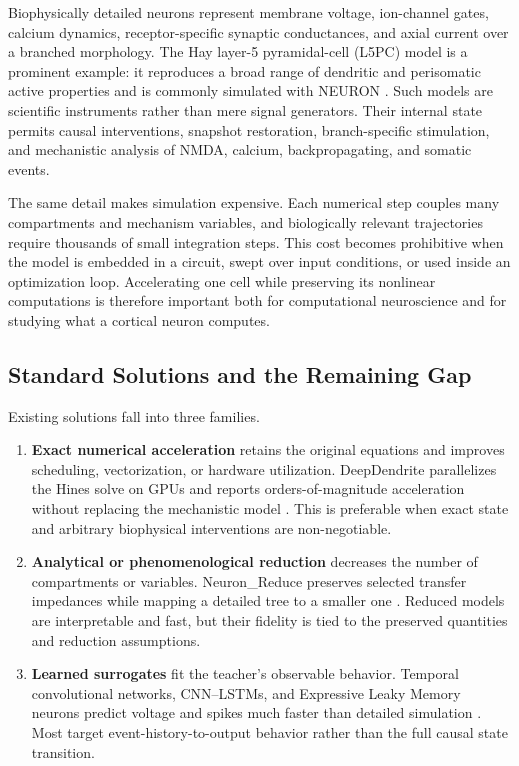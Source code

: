 \documentclass[11pt]{article}
\begin{document}
Biophysically detailed neurons represent membrane voltage, ion-channel gates,
calcium dynamics, receptor-specific synaptic conductances, and axial current
over a branched morphology. The Hay layer-5 pyramidal-cell (L5PC) model is a
prominent example: it reproduces a broad range of dendritic and perisomatic
active properties and is commonly simulated with NEURON
\cite{hay2011,hines1997}. Such models are scientific instruments rather than
mere signal generators. Their internal state permits causal interventions,
snapshot restoration, branch-specific stimulation, and mechanistic analysis
of NMDA, calcium, backpropagating, and somatic events.

The same detail makes simulation expensive. Each numerical step couples many
compartments and mechanism variables, and biologically relevant trajectories
require thousands of small integration steps. This cost becomes prohibitive
when the model is embedded in a circuit, swept over input conditions, or used
inside an optimization loop. Accelerating one cell while preserving its
nonlinear computations is therefore important both for computational
neuroscience and for studying what a cortical neuron computes.

\subsection{Standard Solutions and the Remaining Gap}

Existing solutions fall into three families.
\begin{enumerate}
  \item \textbf{Exact numerical acceleration} retains the original equations
  and improves scheduling, vectorization, or hardware utilization.
  DeepDendrite parallelizes the Hines solve on GPUs and reports
  orders-of-magnitude acceleration without replacing the mechanistic model
  \cite{zhang2023}. This is preferable when exact state and arbitrary
  biophysical interventions are non-negotiable.
  \item \textbf{Analytical or phenomenological reduction} decreases the number
  of compartments or variables. Neuron\_Reduce preserves selected transfer
  impedances while mapping a detailed tree to a smaller one
  \cite{amsalem2020}. Reduced models are interpretable and fast, but their
  fidelity is tied to the preserved quantities and reduction assumptions.
  \item \textbf{Learned surrogates} fit the teacher's observable behavior.
  Temporal convolutional networks, CNN--LSTMs, and Expressive Leaky Memory
  neurons predict voltage and spikes much faster than detailed simulation
  \cite{beniaguev2021,olah2022,spieler2024}. Most target
  event-history-to-output behavior rather than the full causal state transition.
\end{enumerate}
\end{document}
